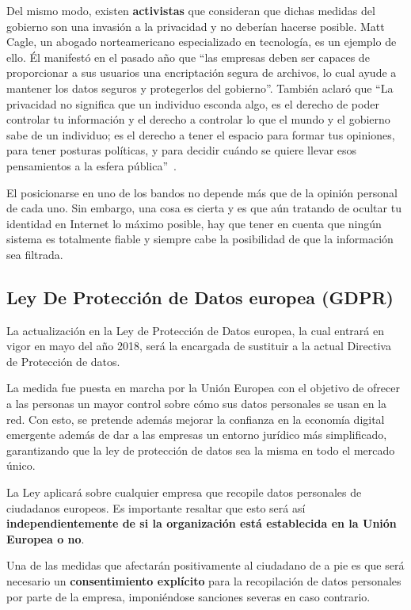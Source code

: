 Del mismo modo, existen \textbf{activistas} que consideran que dichas medidas del gobierno son una invasión a la privacidad y no deberían hacerse posible. Matt Cagle, un abogado norteamericano especializado en tecnología, es un ejemplo de ello. Él manifestó en el pasado año que ``las empresas deben ser capaces de proporcionar a sus usuarios una encriptación segura de archivos, lo cual ayude a mantener los datos seguros y protegerlos del gobierno''. También aclaró que ``La privacidad no significa que un individuo esconda algo, es el derecho de poder controlar tu información y el derecho a controlar lo que el mundo y el gobierno sabe de un individuo; es el derecho a tener el espacio para formar tus opiniones, para tener posturas políticas, y para decidir cuándo se quiere llevar esos pensamientos a la esfera pública''~\cite{article:matt}.

El posicionarse en uno de los bandos no depende más que de la opinión personal de cada uno. Sin embargo, una cosa es cierta y es que aún tratando de ocultar tu identidad en Internet lo máximo posible, hay que tener en cuenta que ningún sistema es totalmente fiable y siempre cabe la posibilidad de que la información sea filtrada.

\subsection{Ley De Protección de Datos europea (GDPR)}

La actualización en la Ley de Protección de Datos europea, la cual entrará en vigor en mayo del año 2018, será la encargada de sustituir a la actual Directiva de Protección de datos. 

La medida fue puesta en marcha por la Unión Europea con el objetivo de ofrecer a las personas un mayor control sobre cómo sus datos personales se usan en la red. Con esto, se pretende además mejorar la confianza en la economía digital emergente además de dar a las empresas un entorno jurídico más simplificado, garantizando que la ley de protección de datos sea la misma en todo el mercado único.

La Ley aplicará sobre cualquier empresa que recopile datos personales de ciudadanos europeos. Es importante resaltar que esto será así \textbf{independientemente de si la organización está establecida en la Unión Europea o no}.

Una de las medidas que afectarán positivamente al ciudadano de a pie es que será necesario un \textbf{consentimiento explícito} para la recopilación de datos personales por parte de la empresa, imponiéndose sanciones severas en caso contrario.

